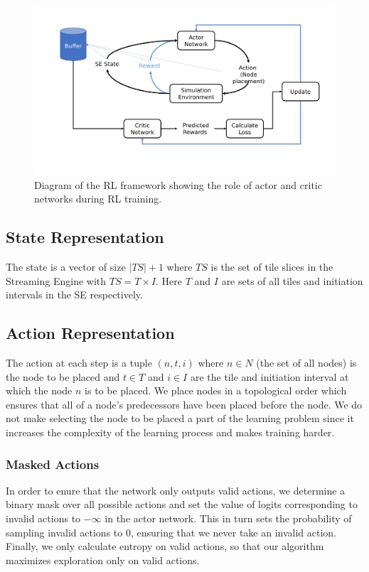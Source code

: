 \begin{figure}[h]
  \centering
  \includegraphics[width=\linewidth]{fig/ppo.pdf}
  \caption{Diagram of the RL framework showing the role of actor and critic networks during RL training. }
  \label{fig:ppo}
\end{figure}

\subsection{State Representation}
The state is a vector of size $|TS|+1$ where $TS$ is the set of tile slices in the Streaming Engine with $TS=T \times I$. Here $T$ and $I$ are sets of all tiles and initiation intervals in the SE respectively.

\subsection{Action Representation}
The action at each step is a tuple \((n,t,i)\) where $n \in N$ (the set of all nodes) is the node to be placed and $t \in T$ and $i \in I$ are the tile and initiation interval at which the node $n$ is to be placed. 
We place nodes in a topological order which ensures that all of a node's predecessors have been placed before the node. 
We do not make selecting the node to be placed a part of the learning problem since it increases the complexity of the learning process and makes training harder.

\subsubsection{Masked Actions}
In order to enure that the network only outputs valid actions, we determine a binary mask over all possible actions and set the value of logits corresponding to invalid actions to $-\infty$ in the actor network. 
This in turn sets the probability of sampling invalid actions to $0$, ensuring that we never take an invalid action.
Finally, we only calculate entropy on valid actions, so that our algorithm maximizes exploration only on valid actions.

